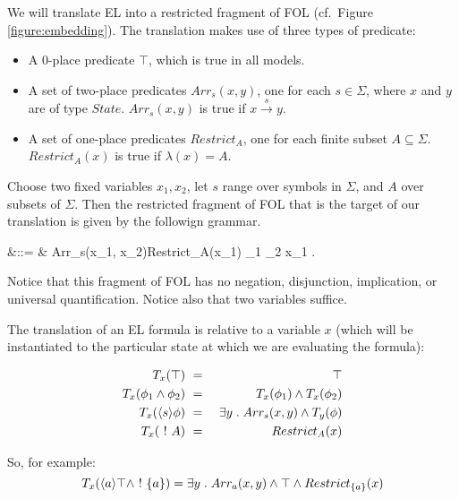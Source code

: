 

\NI We will translate EL into a restricted fragment of FOL  (cf.~Figure
\ref{figure:embedding}). The translation makes use of three types of
predicate:

\begin{itemize}

\item A 0-place predicate $\top$, which is true in all models.

\item A set of two-place predicates $Arr_s(x, y)$, one for each $s \in
  \Sigma$, where $x$ and $y$ are of type $State$. $Arr_s(x, y)$
  is true if $x \xrightarrow{s} y$.

\item A set of one-place predicates $Restrict_A$, one for each finite
  subset $A \subseteq \Sigma$.  $Restrict_{A}(x)$ is true if
  $\lambda(x) = A$.

\end{itemize}

\NI Choose two fixed variables $x_1, x_2$, let $s$ range over symbols
in $\Sigma$, and $A$ over  subsets of
$\Sigma$. Then the restricted fragment of FOL that is the target
of our translation is given by the followign grammar.

\begin{GRAMMAR}
  \phi 
     &\quad ::= \quad&
  \top \fOr Arr_{s}(x_1, x_2)\fOr Restrict_A(x_1) \fOr \phi_1 \AND \phi_2 \fOr \exists x_1 . \phi 
\end{GRAMMAR}

\NI Notice that this fragment of FOL has no negation, disjunction,
implication, or universal quantification. Notice also that two
variables suffice.

The translation of an EL formula is relative to a variable $x$ (which
will be instantiated to the particular state at which we are
evaluating the formula):

\begin{eqnarray*}
  T_x(\top) & \ = \ & \top  \\
  T_x(\phi_1 \land \phi_2) & \ = \ & T_x(\phi_1) \land T_x(\phi_2)  \\
  T_x(\langle s \rangle \phi) & \ = \ & \exists y \; . \; Arr_s(x,y) \land T_y(\phi)  \\
  T_x(\ ! \  A) & \ = \ & Restrict_A(x) 
\end{eqnarray*}

\NI So, for example:
\[
T_x(\langle a \rangle \top \land \ ! \  \{a\}) = \exists y \; . \; Arr_a(x,y) \land \top \land Restrict_{\{a\}}(x)
\]


